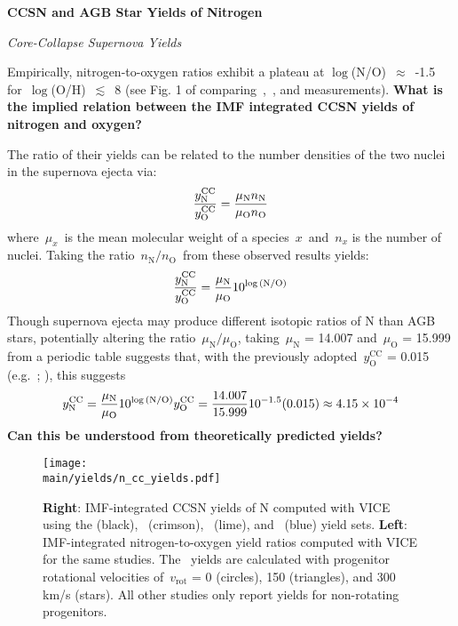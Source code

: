 \documentclass[\main/notes.tex]{subfiles}
\begin{document}
 
\begin{center} 
\textbf{{\Large CCSN and AGB Star Yields of Nitrogen}} 
\end{center} 

\noindent 
{\Large \textit{Core-Collapse Supernova Yields}} 
\par\noindent 
Empirically, nitrogen-to-oxygen ratios exhibit a plateau at 
$\log$(N/O)~$\approx$~-1.5 for~$\log$(O/H)~$\lesssim$~8 (see Fig. 1 of 
\citealp{Vincenzo2016} comparing~\citealp{Berg2012},~\citealp*{Izotov2012}, and 
\citealp{James2015} measurements). 
\twolineskip 
\textbf{What is the implied relation between the IMF integrated CCSN yields of 
nitrogen and oxygen?} 
\par\noindent 
The ratio of their yields can be related to the number densities of the two 
nuclei in the supernova ejecta via: 
\begin{equation} 
\frac{\displaystyle y_\text{N}^\text{CC}}{\displaystyle y_\text{O}^\text{CC}} = 
\frac{\displaystyle \mu_\text{N}n_\text{N}}{\displaystyle \mu_\text{O}n_\text{O}} 
\end{equation} 
where~$\mu_x$~is the mean molecular weight of a species~$x$~and~$n_x$ is the 
number of nuclei. Taking the ratio~$n_\text{N}/n_\text{O}$~from these observed 
results yields: 
\begin{equation} 
\frac{\displaystyle y_\text{N}^\text{CC}}{\displaystyle y_\text{O}^\text{CC}} = 
\frac{\displaystyle \mu_\text{N}}{\displaystyle \mu_\text{O}}10^{\log\text{(N/O)}} 
\end{equation} 
Though supernova ejecta may produce different isotopic ratios of N than AGB 
stars, potentially  
altering the ratio~$\mu_\text{N}/\mu_\text{O}$, taking~$\mu_\text{N}$ = 14.007 
and~$\mu_\text{O}$ = 15.999 from a periodic table suggests that, with the 
previously adopted~$y_\text{O}^\text{CC}$ = 0.015 (e.g.~\citealp*{Weinberg2017}; 
\citealp{Johnson2020,Johnson2021}), this suggests 
\begin{equation} 
y_\text{N}^\text{CC} = \frac{\displaystyle \mu_\text{N}}{\displaystyle \mu_\text{O}}10^{\log\text{(N/O)}} 
y_\text{O}^\text{CC} = \frac{\displaystyle 14.007}{\displaystyle 15.999}10^{-1.5}(0.015) \approx 
4.15\times10^{-4} 
\end{equation} 
\twolineskip 
\textbf{Can this be understood from theoretically predicted yields?} 

\begin{figure*}[!t] 
\centering 
\texttt{[image: \\main/yields/n\_cc\_yields.pdf]} 
\caption{
\textbf{Right}: IMF-integrated CCSN yields of N computed with VICE using the 
\citet{Limongi2018} (black),~\citet{Sukhbold2016} (crimson),~\citet{Nomoto2013} 
(lime), and~\citet{Woosley1995} (blue) yield sets. 
\textbf{Left}: IMF-integrated nitrogen-to-oxygen yield ratios computed with 
VICE for the same studies. 
The~\citet{Limongi2018} yields are calculated with progenitor rotational 
velocities of~$v_\text{rot}$ = 0 (circles), 150 (triangles), and 300 km/s 
(stars). 
All other studies only report yields for non-rotating progenitors. } 
\label{fig:n_cc_yields} 
\end{figure*} 
\end{document}
